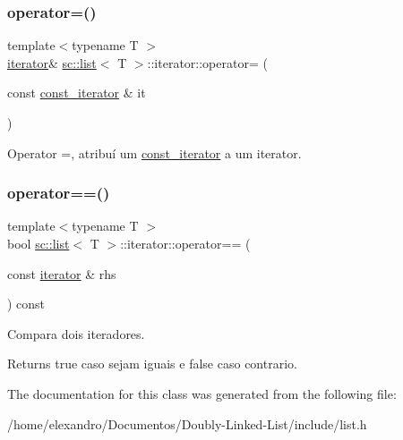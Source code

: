 \subsubsection{\texorpdfstring{operator=()}{operator=()}\hspace{0.1cm}{\footnotesize\ttfamily [2/2]}}
{\footnotesize\ttfamily template$<$typename T $>$ \\
\hyperlink{classsc_1_1list_1_1iterator}{iterator}\& \hyperlink{classsc_1_1list}{sc\+::list}$<$ T $>$\+::iterator\+::operator= (\begin{DoxyParamCaption}\item[{const \hyperlink{classsc_1_1list_1_1const__iterator}{const\+\_\+iterator} \&}]{it }\end{DoxyParamCaption})\hspace{0.3cm}{\ttfamily [inline]}}

Operator =, atribuí um \hyperlink{classsc_1_1list_1_1const__iterator}{const\+\_\+iterator} a um iterator. \mbox{\label{classsc_1_1list_1_1iterator_a26eaacd8583e5d26a65cd6f6ef31f2bb}} 
\subsubsection{\texorpdfstring{operator==()}{operator==()}}
{\footnotesize\ttfamily template$<$typename T $>$ \\
bool \hyperlink{classsc_1_1list}{sc\+::list}$<$ T $>$\+::iterator\+::operator== (\begin{DoxyParamCaption}\item[{const \hyperlink{classsc_1_1list_1_1iterator}{iterator} \&}]{rhs }\end{DoxyParamCaption}) const\hspace{0.3cm}{\ttfamily [inline]}}

Compara dois iteradores. \begin{DoxyReturn}{Returns}
true caso sejam iguais e false caso contrario. 
\end{DoxyReturn}


The documentation for this class was generated from the following file\+:\begin{DoxyCompactItemize}
\item 
/home/elexandro/\+Documentos/\+Doubly-\/\+Linked-\/\+List/include/list.\+h\end{DoxyCompactItemize}

